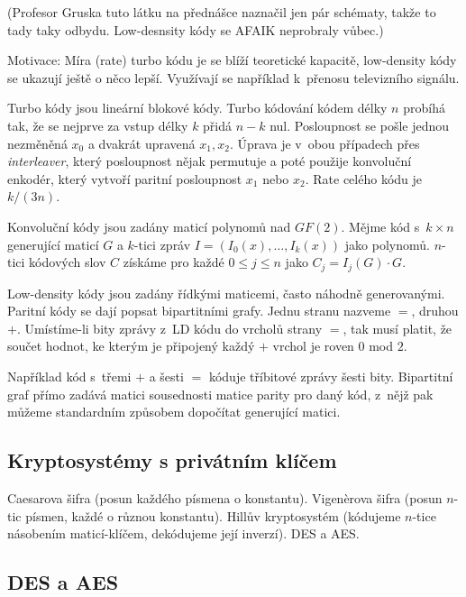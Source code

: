 (Profesor Gruska tuto látku na přednášce naznačil jen pár schématy, takže
to tady taky odbydu. Low-desnsity kódy se AFAIK neprobraly vůbec.)


Motivace: Míra (rate) turbo kódu je se blíží teoretické kapacitě,
low-density kódy se ukazují ještě o něco lepší. Využívají se například
k~přenosu televizního signálu.

Turbo kódy jsou lineární blokové kódy.
Turbo kódování kódem délky $n$ probíhá tak, že se nejprve za vstup délky $k$ přidá $n -
k$ nul. Posloupnost se pošle jednou nezměněná $x_0$ a dvakrát upravená
$x_1, x_2$. Úprava
je v~obou případech přes {\em interleaver}, který posloupnost nějak
permutuje a poté použije konvoluční enkodér, který vytvoří paritní
posloupnost $x_1$ nebo $x_2$. Rate celého kódu je $k/(3n)$.

Konvoluční kódy jsou zadány maticí polynomů nad $GF(2)$. Mějme kód
s~$k\times n$ generující maticí $G$ a $k$-tici zpráv
$I = (I_0(x),\ldots,I_k(x))$ jako polynomů. $n$-tici kódových slov
$C$ získáme pro každé $0 \leq j \leq n$ jako $C_j = I_j(G) \cdot G$.


Low-density kódy jsou zadány řídkými maticemi, často náhodně
generovanými. Paritní kódy se dají popsat bipartitními grafy.
Jednu stranu nazveme $=$, druhou $+$. Umístíme-li bity zprávy z~LD kódu
do vrcholů strany $=$, tak musí platit, že součet hodnot, ke kterým je
připojený každý $+$ vrchol je roven $0$ mod $2$.

Například kód s~třemi $+$ a šesti $=$ kóduje tříbitové zprávy šesti
bity. Bipartitní graf přímo zadává matici sousednosti matice parity pro
daný kód, z~nějž pak můžeme standardním způsobem dopočítat generující
matici.


\subsection{Kryptosystémy s privátním klíčem}

Caesarova šifra (posun každého písmena o konstantu).
Vigenèrova šifra (posun $n$-tic písmen, každé o různou konstantu).
Hillův kryptosystém (kódujeme $n$-tice násobením maticí-klíčem,
dekódujeme její inverzí). DES a AES.

\subsection{DES a AES}

